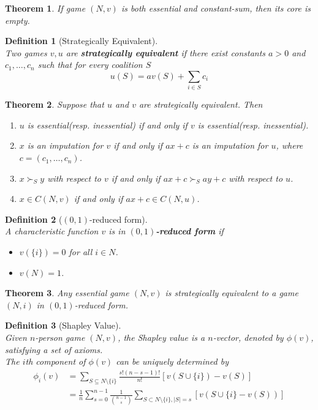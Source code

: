 \documentclass[12pt]{article}
\newtheorem{definition}{Definition}[section]
\newtheorem{theorem}{Theorem}[section]
\theoremstyle{definition}
\begin{document}
\begin{theorem}\normalfont If game $(N, v)$ is both essential and constant-sum, then its core is empty.
\end{theorem}
\begin{definition}[Strategically Equivalent]
\hfill\\\normalfont Two games $v, u$ are \textbf{strategically equivalent} if there exist constants $a>0$ and $c_1,\ldots, c_n$ such that for every coalition $S$
\[
u(S)=av(S)+\sum_{i\in S}c_i
\]
\end{definition}
\begin{theorem}\normalfont Suppose that $u$ and $v$ are strategically equivalent. Then
\begin{enumerate}
  \item $u$ is essential(resp. inessential) \textit{if and only if} $v$ is essential(resp. inessential).
  \item $x$ is an imputation for $v$ \textit{if and only if} $ax+c$ is an imputation for $u$, where $c=(c_1,\ldots, c_n)$.
  \item $x\succ_S y$ with respect to $v$ \textit{if and only if} $ax+c\succ_S ay+c$ with respect to $u$.
  \item $x\in C(N, v)$ \textit{if and only if} $ax+c\in C(N, u)$.
\end{enumerate} 
\end{theorem}
\begin{definition}[{$(0,1)$}-reduced form]
\hfill\\\normalfont A characteristic function $v$ is in $(0,1)$\textbf{-reduced form} if
\begin{itemize}
\item $v(\{i\})=0$ for all $i\in N$.
\item $v(N)=1$.
\end{itemize} 
\end{definition}
\begin{theorem}\normalfont Any essential game $(N, v)$ is strategically equivalent to a game $(N, i)$ in $(0,1)$-reduced form.
\end{theorem}
\begin{definition}[Shapley Value]
\hfill\\\normalfont Given $n$-person game $(N, v)$, the Shapley value is a $n$-vector, denoted by $\phi(v)$, satisfying a set of axioms. \\
The $i$th component of $\phi(v)$ can be uniquely determined by
\begin{align*}
\phi_i(v)&=\sum_{S\subseteq N\setminus\{i\}}\frac{s!(n-s-1)!}{n!}[v(S\cup \{i\})-v(S)]\\
&=\frac{1}{n}\sum_{s=0}^{n-1}\frac{1}{\binom{n-1}{s}}\sum_{S\subset N\setminus\{i\}, |S|=s}[v(S\cup\{i\}-v(S))]
\end{align*}
\end{definition}
\end{document}

